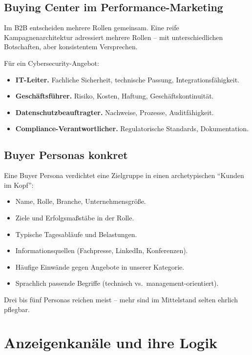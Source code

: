 \documentclass[11pt,a4paper,oneside]{article}
\begin{document}
\subsection{Buying Center im Performance-Marketing}

Im B2B entscheiden mehrere Rollen gemeinsam. Eine reife Kampagnenarchitektur adressiert mehrere Rollen -- mit unterschiedlichen Botschaften, aber konsistentem Versprechen.

Für ein Cybersecurity-Angebot:

\begin{itemize}
  \item \textbf{IT-Leiter.} Fachliche Sicherheit, technische Passung, Integrationsfähigkeit.
  \item \textbf{Geschäftsführer.} Risiko, Kosten, Haftung, Geschäftskontinuität.
  \item \textbf{Datenschutzbeauftragter.} Nachweise, Prozesse, Auditfähigkeit.
  \item \textbf{Compliance-Verantwortlicher.} Regulatorische Standards, Dokumentation.
\end{itemize}

\subsection{Buyer Personas konkret}

Eine Buyer Persona verdichtet eine Zielgruppe in einen archetypischen ``Kunden im Kopf'':

\begin{itemize}
  \item Name, Rolle, Branche, Unternehmensgröße.
  \item Ziele und Erfolgsmaßstäbe in der Rolle.
  \item Typische Tagesabläufe und Belastungen.
  \item Informationsquellen (Fachpresse, LinkedIn, Konferenzen).
  \item Häufige Einwände gegen Angebote in unserer Kategorie.
  \item Sprachlich passende Begriffe (technisch vs.\ management-orientiert).
\end{itemize}

Drei bis fünf Personas reichen meist -- mehr sind im Mittelstand selten ehrlich pflegbar.

\section{Anzeigenkanäle und ihre Logik}
\end{document}
